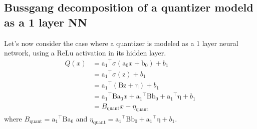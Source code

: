 \documentclass[12pt]{article}
\newcommand{\vect}[1]{\boldsymbol{\mathrm{#1}}}
\newcommand{\mat}[1]{\boldsymbol{\mathrm{#1}}}
\theoremstyle{remark}
\begin{document}
\subsection{Bussgang decomposition of a quantizer modeld as a 1 layer NN}
Let's now consider the case where a quantizer is modeled as a 1 layer neural network, using a ReLu activation in its hidden layer.
\begin{align}
	Q(x) &= \vect{a_1}^{\intercal} \sigma(\vect{a_0}x +\vect{b_0}) + b_1\\
	&= \vect{a_1}^{\intercal} \sigma(\vect{z}) + b_1\\
	&= \vect{a_1}^{\intercal} \left(\mat{B} \vect{z} + \vect{\eta}\right) + b_1\\
	&= \vect{a_1}^{\intercal} \mat{B} \vect{a_0} x + \vect{a_1}^{\intercal} \mat{B} \vect{b_0} + \vect{a_1}^{\intercal}\vect{\eta} + b_1\\
	&= B_{\mathrm{quant}} x + \eta_{\mathrm{quant}}
\end{align}
where $B_{\mathrm{quant}} = \vect{a_1}^{\intercal} \mat{B} \vect{a_0}$ and $\eta_{\mathrm{quant}} = \vect{a_1}^{\intercal} \mat{B} \vect{b_0} + \vect{a_1}^{\intercal}\vect{\eta} + b_1$.







\end{document}
